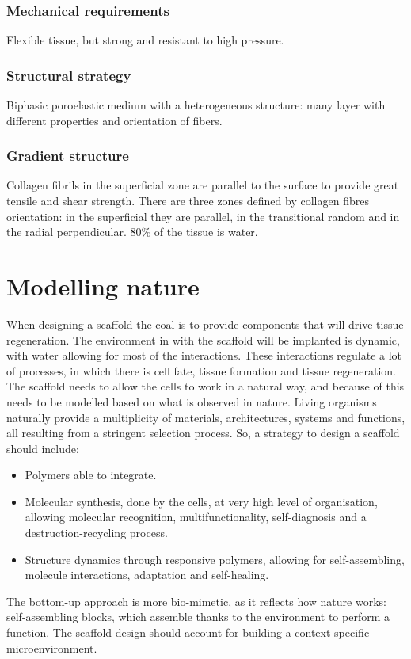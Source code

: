 		\subsubsection{Mechanical requirements}
		Flexible tissue, but strong and resistant to high pressure.

		\subsubsection{Structural strategy}
		Biphasic poroelastic medium with a heterogeneous structure: many layer with different properties and orientation of fibers.

		\subsubsection{Gradient structure}
		Collagen fibrils in the superficial zone are parallel to the surface to provide great tensile and shear strength.
		There are three zones defined by collagen fibres orientation: in the superficial they are parallel, in the transitional random and in the radial perpendicular.
		$80\%$ of the tissue is water.


\section{Modelling nature}
When designing a scaffold the coal is to provide components that will drive tissue regeneration.
The environment in with the scaffold will be implanted is dynamic, with water allowing for most of the interactions.
These interactions regulate a lot of processes, in which there is cell fate, tissue formation and tissue regeneration.
The scaffold needs to allow the cells to work in a natural way, and because of this needs to be modelled based on what is observed in nature.
Living organisms naturally provide a multiplicity of materials, architectures, systems and functions, all resulting from a stringent selection process.
So, a strategy to design a scaffold should include:

\begin{multicols}{2}
	\begin{itemize}
		\item Polymers able to integrate.
		\item Molecular synthesis, done by the cells, at very high level of organisation, allowing molecular recognition, multifunctionality, self-diagnosis and a destruction-recycling process.
		\item Structure dynamics through responsive polymers, allowing for self-assembling, molecule interactions, adaptation and self-healing.
	\end{itemize}
\end{multicols}

The bottom-up approach is more bio-mimetic, as it reflects how nature works: self-assembling blocks, which assemble thanks to the environment to perform a function.
The scaffold design should account for building a context-specific microenvironment.
